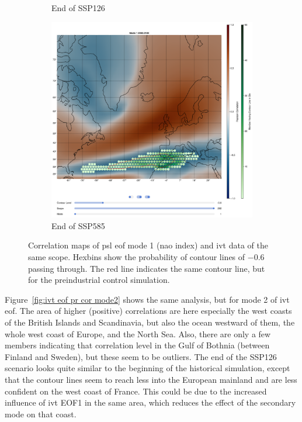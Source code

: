 \begin{figure}[!htb]
\begin{subfigure}[b]{0.49\textwidth}
    \caption{End of SSP126} 
    \label{fig:psl eof ivt cor ssp126 mode1}
  \end{subfigure}
  \begin{subfigure}[b]{0.49\textwidth}
    \includegraphics[width=\textwidth]{figures/psl_ivt_cor_mode1_ssp585.png}
    \caption{End of SSP585}
    \label{fig:psl eof ivt cor ssp585 mode1}
  \end{subfigure}
  \caption[Correlation Maps of PSL EOF Mode 1 and IVT Data]{Correlation maps of \ac{psl} \ac{eof} mode 1 (\ac{nao} index) and \ac{ivt} data of the same scope. Hexbins show the probability of contour lines of $-0.6$ passing through. The red line indicates the same contour line, but for the preindustrial control simulation.}
  \label{fig:psl eof ivt cor mode1}
\end{figure}

Figure~\ref{fig:ivt eof pr cor mode2} shows the same analysis, but for mode 2 of \ac{ivt} \ac{eof}. 
The area of higher (positive) correlations are here especially the west coasts of the British Islands and Scandinavia, but also the ocean westward of them, the whole west coast of Europe, and the North Sea. 
Also, there are only a few members indicating that correlation level in the Gulf of Bothnia (between Finland and Sweden), but these seem to be outliers. 
The end of the SSP126 scenario looks quite similar to the beginning of the historical simulation, except that the contour lines seem to reach less into the European mainland and are less confident on the west coast of France.  
This could be due to the increased influence of \ac{ivt} EOF1 in the same area, which reduces the effect of the secondary mode on that coast. 


